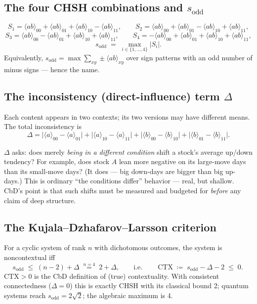 \documentclass[11pt]{article}
\newcommand{\E}[1]{\langle ab\rangle_{#1}}
\newcommand{\sodd}{s_{\mathrm{odd}}}
\begin{document}
\subsection{The four CHSH combinations and \texorpdfstring{$\sodd$}{s\_odd}}

\[
  S_1=\E{00}+\E{01}+\E{10}-\E{11},\qquad
  S_2=\E{00}+\E{01}-\E{10}+\E{11},
\]
\[
  S_3=\E{00}-\E{01}+\E{10}+\E{11},\qquad
  S_4=-\E{00}+\E{01}+\E{10}+\E{11},
\]
\[
  \sodd \;=\; \max_{i\in\{1,\dots,4\}} |S_i|.
\]
Equivalently, $\sodd=\max\sum_{xy}\pm\E{xy}$ over sign patterns with an odd number of minus
signs --- hence the name.

\subsection{The inconsistency (direct-influence) term \texorpdfstring{$\Delta$}{Delta}}

Each content appears in two contexts; its two versions may have different means. The total
inconsistency is
\[
  \Delta
  =\big|\langle a\rangle_{00}-\langle a\rangle_{01}\big|
  +\big|\langle a\rangle_{10}-\langle a\rangle_{11}\big|
  +\big|\langle b\rangle_{00}-\langle b\rangle_{10}\big|
  +\big|\langle b\rangle_{01}-\langle b\rangle_{11}\big|.
\]

\begin{intuition}
$\Delta$ asks: does merely \emph{being in a different condition} shift a stock's average
up/down tendency? For example, does stock $A$ lean more negative on its large-move days than
its small-move days? (It does --- big down-days are bigger than big up-days.) This is ordinary
``the conditions differ'' behavior --- real, but shallow. CbD's point is that such shifts must
be measured and budgeted for \emph{before} any claim of deep structure.
\end{intuition}

\subsection{The Kujala--Dzhafarov--Larsson criterion}

For a cyclic system of rank $n$ with dichotomous outcomes, the system is noncontextual iff
\[
  \sodd \;\le\; (n-2) + \Delta \;\overset{n=4}{=}\; 2+\Delta,
  \qquad\text{i.e.}\qquad
  \boxed{\ \mathrm{CTX}\;\coloneqq\;\sodd-\Delta-2\;\le\;0.\ }
\]
$\mathrm{CTX}>0$ is the CbD definition of (true) contextuality. With consistent
connectedness ($\Delta=0$) this is exactly CHSH with its classical bound 2; quantum systems
reach $\sodd=2\sqrt2$; the algebraic maximum is 4.
\end{document}

